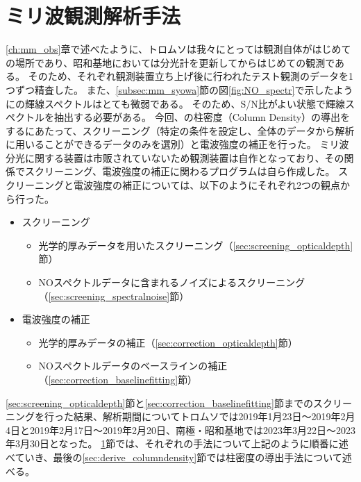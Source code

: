\chapter{ミリ波観測解析手法}
\label{ch:mm_analysis}
\ref{ch:mm_obs}章で述べたように、トロムソは我々にとっては観測自体がはじめての場所であり、昭和基地においては分光計を更新してからはじめての観測である。
そのため、それぞれ観測装置立ち上げ後に行われたテスト観測のデータを1つずつ精査した。
また、\ref{subsec:mm_syowa}節の図\ref{fig:NO_spectr}で示したようにの輝線スペクトルはとても微弱である。
そのため、S/N比がよい状態で輝線スペクトルを抽出する必要がある。
今回、の柱密度（Column Density）の導出をするにあたって、スクリーニング（特定の条件を設定し、全体のデータから解析に用いることができるデータのみを選別）と電波強度の補正を行った。
ミリ波分光に関する装置は市販されていないため観測装置は自作となっており、その関係でスクリーニング、電波強度の補正に関わるプログラムは自ら作成した。
スクリーニングと電波強度の補正については、以下のようにそれぞれ2つの観点から行った。
\begin{itemize}
    \item スクリーニング
    \begin{itemize}
        \item 光学的厚みデータを用いたスクリーニング（\ref{sec:screening_opticaldepth}節）
        \item NOスペクトルデータに含まれるノイズによるスクリーニング（\ref{sec:screening_spectralnoise}節）
    \end{itemize}
    \item 電波強度の補正
    \begin{itemize}
        \item 光学的厚みデータの補正（\ref{sec:correction_opticaldepth}節）
        \item NOスペクトルデータのベースラインの補正（\ref{sec:correction_baselinefitting}節）
    \end{itemize}
\end{itemize}
\ref{sec:screening_opticaldepth}節と\ref{sec:correction_baselinefitting}節までのスクリーニングを行った結果、解析期間についてトロムソでは2019年1月23日〜2019年2月4日と2019年2月17日〜2019年2月20日、南極・昭和基地では2023年3月22日〜2023年3月30日となった。
\ref{ch:mm_analysis}節では、それぞれの手法について上記のように順番に述べていき、最後の\ref{sec:derive_columndensity}節では柱密度の導出手法について述べる。


